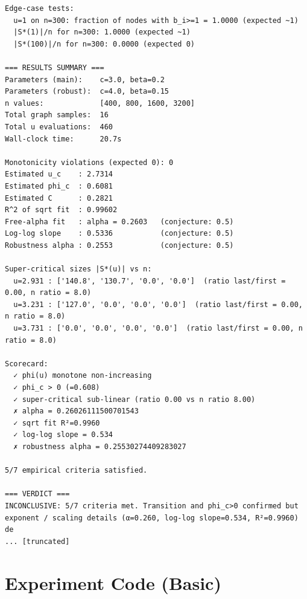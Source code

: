 \documentclass[11pt]{article}
\begin{document}
\begin{lstlisting}
Edge-case tests:
  u=1 on n=300: fraction of nodes with b_i>=1 = 1.0000 (expected ~1)
  |S*(1)|/n for n=300: 1.0000 (expected ~1)
  |S*(100)|/n for n=300: 0.0000 (expected 0)

=== RESULTS SUMMARY ===
Parameters (main):    c=3.0, beta=0.2
Parameters (robust):  c=4.0, beta=0.15
n values:             [400, 800, 1600, 3200]
Total graph samples:  16
Total u evaluations:  460
Wall-clock time:      20.7s

Monotonicity violations (expected 0): 0
Estimated u_c    : 2.7314
Estimated phi_c  : 0.6081
Estimated C      : 0.2821
R^2 of sqrt fit  : 0.99602
Free-alpha fit   : alpha = 0.2603   (conjecture: 0.5)
Log-log slope    : 0.5336           (conjecture: 0.5)
Robustness alpha : 0.2553           (conjecture: 0.5)

Super-critical sizes |S*(u)| vs n:
  u=2.931 : ['140.8', '130.7', '0.0', '0.0']  (ratio last/first = 0.00, n ratio = 8.0)
  u=3.231 : ['127.0', '0.0', '0.0', '0.0']  (ratio last/first = 0.00, n ratio = 8.0)
  u=3.731 : ['0.0', '0.0', '0.0', '0.0']  (ratio last/first = 0.00, n ratio = 8.0)

Scorecard:
  ✓ phi(u) monotone non-increasing
  ✓ phi_c > 0 (=0.608)
  ✓ super-critical sub-linear (ratio 0.00 vs n ratio 8.00)
  ✗ alpha = 0.26026111500701543
  ✓ sqrt fit R²=0.9960
  ✓ log-log slope = 0.534
  ✗ robustness alpha = 0.25530274409283027

5/7 empirical criteria satisfied.

=== VERDICT ===
INCONCLUSIVE: 5/7 criteria met. Transition and phi_c>0 confirmed but exponent / scaling details (α=0.260, log-log slope=0.534, R²=0.9960) de
... [truncated]
\end{lstlisting}


\section{Experiment Code (Basic)}
\end{document}
